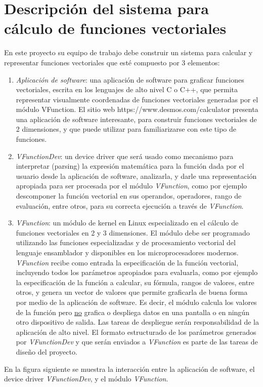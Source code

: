 \documentclass[12pt,letterpaper]{article}
\begin{document}
\section*{Descripción del sistema para cálculo de funciones vectoriales}

En este proyecto su equipo de trabajo debe construir un sistema para calcular y representar funciones vectoriales que esté compuesto por 3 elementos:
\begin{enumerate}

\item \textit{Aplicación de software}: una aplicación de software para graficar funciones vectoriales, escrita en los lenguajes de alto nivel C o C++, que permita representar visualmente coordenadas de funciones vectoriales generadas por el módulo VFunction. El sitio web https://www.desmos.com/calculator presenta una aplicación de software interesante, para construir funciones vectoriales de 2 dimensiones, y que puede utilizar para familiarizarse con este tipo de funciones.

\item \textit{VFunctionDev}: un device driver que será usado como mecanismo para interpretar (parsing) la expresión matemática para la función dada por el usuario desde la aplicación de software, analizarla, y darle una representación apropiada para ser procesada por el módulo \textit{VFunction}, como por ejemplo descomponer la función vectorial en sus operandos, operadores, rango de evaluación, entre otros, para su correcta ejecución a través de \textit{VFunction}. 

\item \textit{VFunction}: un módulo de kernel en Linux especializado en el cálculo de funciones vectoriales en 2 y 3 dimensiones. El módulo debe ser programado utilizando las funciones especializadas y de procesamiento vectorial del lenguaje ensamblador y disponibles en los microprocesadores modernos. \textit{VFunction} recibe como entrada la especificación de la función vectorial, incluyendo todos los parámetros apropiados para evaluarla, como por ejemplo la especificación de la función a calcular, su fórmula, rangos de valores, entre otros, y genera un vector de valores que permite graficarla de buena forma por medio de la aplicación de software. Es decir, el módulo calcula los valores de la función pero \underline{no} grafica o despliega datos en una pantalla o en ningún otro dispositivo de salida. Las tareas de despliegue serán responsabilidad de la aplicación de alto nivel. El formato estructurado de los parámetros generados por \textit{VFunctionDev} y que serán enviados a \textit{VFunction} es parte de las tareas de diseño del proyecto.

\end{enumerate} 
En la figura siguiente se muestra la interacción entre la aplicación de software, el device driver \textit{VFunctionDev}, y el módulo \textit{VFunction}.
\end{document}
